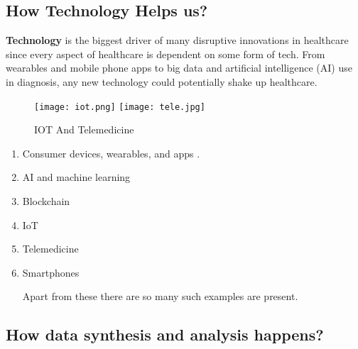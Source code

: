 \documentclass[12pts]{article}
\begin{document}
\subsection*{How Technology Helps us? }
\begin{large}

\textbf{Technology} is the biggest driver of many disruptive innovations in healthcare since every aspect of healthcare is dependent on some form of tech. From wearables and mobile phone apps to big data and artificial intelligence (AI) use in diagnosis, any new technology could potentially shake up healthcare.\\
\begin{figure}[h]
\centering
\texttt{[image: iot.png]}
\texttt{[image: tele.jpg]}
\caption{IOT And Telemedicine}
\end{figure}

\begin{enumerate}
\item Consumer devices, wearables, and apps .
\item AI and machine learning
\item Blockchain  
\item IoT 
\item Telemedicine
\item Smartphones


Apart from these there are so many such examples are present.   
\end{enumerate}
\end{large}

\subsection*{How data synthesis and analysis happens?}
\end{document}

